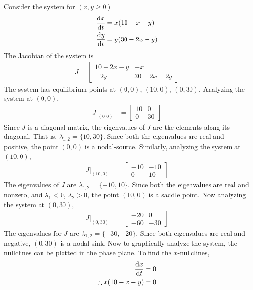 \documentclass[11pt,1in]{article}
\newenvironment{Example}[2][Example]{\begin{trivlist}
		\item[\hskip \labelsep {\bfseries #1}\hskip \labelsep {\bfseries #2.}]}{\end{trivlist}}
\begin{document}
\begin{Example}{1} \cite[p.~488]{diff_eq}
	Consider the system for $(x,y \geq 0)$
	\begin{align*}
    \derivative{x}{t} &= x(10 - x - y) \\
    \derivative{y}{t} &= y(30 - 2x - y)
\end{align*}
The Jacobian of the system is 
\begin{align*}
    J = \begin{bmatrix}
    10 - 2x - y & -x \\
    -2y & 30 - 2x - 2y
    \end{bmatrix}
\end{align*}
The system has equilibrium points at $(0,0)$, $(10,0)$, $(0,30)$. Analyzing the system at $(0,0)$,
\begin{align*}
    J|_{(0,0)} &= \begin{bmatrix}
    10 & 0 \\
    0 & 30
    \end{bmatrix}
\end{align*}
Since $J$ is a diagonal matrix, the eigenvalues of $J$ are the elements along its diagonal. That is, $\lambda_{1,2} = \{ 10, 30 \}$. Since both the eigenvalues are real and positive, the point $(0,0)$ is a nodal-source.
Similarly, analyzing the system at $(10,0)$,
\begin{align*}
    J|_{(10,0)} &= 
    \begin{bmatrix}
    -10 & -10\\
    0 & 10 
    \end{bmatrix}
\end{align*}
The eigenvalues of $J$ are $\lambda_{1,2} = \{-10, 10\}$. Since both the eigenvalues are real and nonzero, and $\lambda_1 < 0$, $\lambda_2 > 0$, the point $(10,0)$ is a saddle point. 
Now analyzing the system at $(0,30)$,
\begin{align*}
J|_{(0,30)} &= \begin{bmatrix}
-20 & 0 \\
-60 & -30 
\end{bmatrix}
\end{align*}
The eigenvalues for $J$ are $\lambda_{1,2} = \{-30, -20\}$. Since both eigenvalues are real and negative, $(0,30)$ is a nodal-sink. 
Now to graphically analyze the system, the nullclines can be plotted in the phase plane.
To find the $x$-nullclines,
\begin{align*}
\derivative{x}{t} &= 0\\
\therefore x(10 - x -y) &= 0

\end{align*}
\end{Example}
\end{document}
